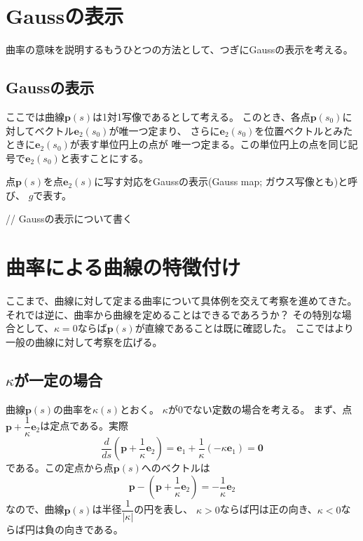 \documentclass[a4j,disablejfam,dvipdfmx,papersize,slide,uplatex,21pt]{jsarticle}
\begin{document}
\section{Gaussの表示}
曲率の意味を説明するもうひとつの方法として、つぎにGaussの表示を考える。

\newpage
\subsection*{Gaussの表示}
ここでは曲線$\bm{p}(s)$は1対1写像であるとして考える。
このとき、各点$\bm{p}(s_0)$に対してベクトル$\bm{e}_2(s_0)$が唯一つ定まり、
さらに$\bm{e}_2(s_0)$を位置ベクトルとみたときに$\bm{e}_2(s_0)$が表す単位円上の点が
唯一つ定まる。この単位円上の点を同じ記号で$\bm{e}_2(s_0)$と表すことにする。

点$\bm{p}(s)$を点$\bm{e}_2(s)$に写す対応をGaussの表示(Gauss map; ガウス写像とも)と呼び、
$g$で表す。

\newpage
// Gaussの表示について書く




\section{曲率による曲線の特徴付け}
ここまで、曲線に対して定まる曲率について具体例を交えて考察を進めてきた。
それでは逆に、曲率から曲線を定めることはできるであろうか？
その特別な場合として、$\kappa = 0$ならば$\bm{p}(s)$が直線であることは既に確認した。
ここではより一般の曲線に対して考察を広げる。

\newpage
\subsection*{$\kappa$が一定の場合}
曲線$\bm{p}(s)$の曲率を$\kappa(s)$とおく。
$\kappa$が$0$でない定数の場合を考える。
まず、点$\bm{p} + \dfrac{1}{\kappa} \bm{e}_2$は定点である。実際
\begin{equation}
    \frac{d}{ds} \left( \bm{p} + \dfrac{1}{\kappa} \bm{e}_2 \right)
    = \bm{e}_1 + \frac{1}{\kappa} (- \kappa \bm{e}_1)
    = \bm{0}
\end{equation}
である。この定点から点$\bm{p}(s)$へのベクトルは
\begin{equation}
    \bm{p} - \left( \bm{p} + \dfrac{1}{\kappa} \bm{e}_2 \right)
    = - \frac{1}{\kappa} \bm{e}_2
\end{equation}
なので、曲線$\bm{p}(s)$は半径$\dfrac{1}{|\kappa|}$の円を表し、
$\kappa > 0$ならば円は正の向き、$\kappa < 0$ならば円は負の向きである。
\end{document}

